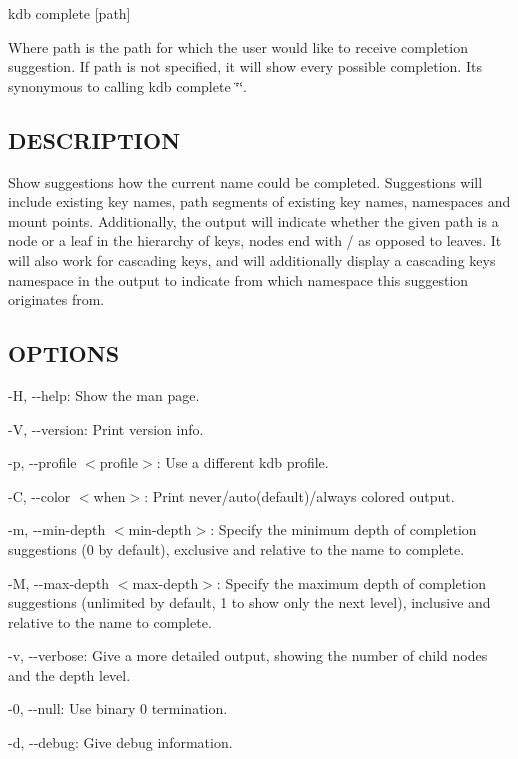 {\ttfamily kdb complete \mbox{[}path\mbox{]}}

Where {\ttfamily path} is the path for which the user would like to receive completion suggestion. If {\ttfamily path} is not specified, it will show every possible completion. Its synonymous to calling {\ttfamily kdb complete \char`\"{}\char`\"{}}.

\subsection*{D\+E\+S\+C\+R\+I\+P\+T\+I\+ON}

Show suggestions how the current name could be completed. Suggestions will include existing key names, path segments of existing key names, namespaces and mount points. Additionally, the output will indicate whether the given path is a node or a leaf in the hierarchy of keys, nodes end with \textquotesingle{}/\textquotesingle{} as opposed to leaves. It will also work for cascading keys, and will additionally display a cascading key\textquotesingle{}s namespace in the output to indicate from which namespace this suggestion originates from.

\subsection*{O\+P\+T\+I\+O\+NS}


\begin{DoxyItemize}
\item {\ttfamily -\/H}, {\ttfamily -\/-\/help}\+: Show the man page.
\item {\ttfamily -\/V}, {\ttfamily -\/-\/version}\+: Print version info.
\item {\ttfamily -\/p}, {\ttfamily -\/-\/profile $<$profile$>$}\+: Use a different kdb profile.
\item {\ttfamily -\/C}, {\ttfamily -\/-\/color $<$when$>$}\+: Print never/auto(default)/always colored output.
\item {\ttfamily -\/m}, {\ttfamily -\/-\/min-\/depth $<$min-\/depth$>$}\+: Specify the minimum depth of completion suggestions (0 by default), exclusive and relative to the name to complete.
\item {\ttfamily -\/M}, {\ttfamily -\/-\/max-\/depth $<$max-\/depth$>$}\+: Specify the maximum depth of completion suggestions (unlimited by default, 1 to show only the next level), inclusive and relative to the name to complete.
\item {\ttfamily -\/v}, {\ttfamily -\/-\/verbose}\+: Give a more detailed output, showing the number of child nodes and the depth level.
\item {\ttfamily -\/0}, {\ttfamily -\/-\/null}\+: Use binary 0 termination.
\item {\ttfamily -\/d}, {\ttfamily -\/-\/debug}\+: Give debug information.
\end{DoxyItemize}

